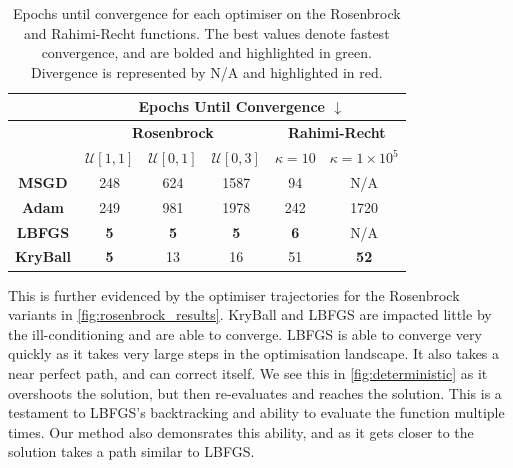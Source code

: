\begin{table}[!t]
    \caption{Epochs until convergence for each optimiser on the Rosenbrock and Rahimi-Recht functions. The best values denote fastest convergence, and are bolded and highlighted in green. Divergence is represented by N/A and highlighted in red.}
    \label{tab:task_1_convergence_table}
    \begin{tabular}{cccccc}
    \hline
    \multicolumn{1}{l}{} & \multicolumn{5}{c}{\textbf{Epochs Until Convergence $\downarrow$}}                                                                                                                                   \\ \hline
                         & \multicolumn{3}{c}{\textbf{Rosenbrock}}                                                                      & \multicolumn{2}{c}{\textbf{Rahimi-Recht}}                                \\
                         & \textbf{$\mathcal{U}[1,1]$}                & \textbf{$\mathcal{U}[0,1]$}                & \textbf{$\mathcal{U}[0,3]$}                & \textbf{$\kappa = 10$}                      & \textbf{$\kappa = 1 \times 10^5$}                      \\ \hline
    \textbf{MSGD}        & 248                                & 624                                & 1587                               & \cellcolor[HTML]{FFFFFF}94         & \cellcolor[HTML]{FD6864}N/A         \\
    \textbf{Adam}        & 249                                & 981                                & 1978                               & 242                                & \cellcolor[HTML]{FFFFFF}1720        \\ \hline
    \textbf{LBFGS}       & \cellcolor[HTML]{34FF34}\textbf{5} & \cellcolor[HTML]{34FF34}\textbf{5} & \cellcolor[HTML]{34FF34}\textbf{5} & \cellcolor[HTML]{34FF34}\textbf{6} & \cellcolor[HTML]{FD6864}N/A         \\
    \textbf{KryBall}     & \cellcolor[HTML]{34FF34}\textbf{5} & 13                                 & 16                                 & 51                                 & \cellcolor[HTML]{34FF34}\textbf{52} \\ \hline
    \end{tabular}
\end{table}

This is further evidenced by the optimiser trajectories for the Rosenbrock variants in \cref{fig:rosenbrock_results}. KryBall and LBFGS are impacted little by the ill-conditioning and are able to converge. LBFGS is able to converge very quickly as it takes very large steps in the optimisation landscape. It also takes a near perfect path, and can correct itself. We see this in \cref{fig:deterministic} as it overshoots the solution, but then re-evaluates and reaches the solution. This is a testament to LBFGS's backtracking and ability to evaluate the function multiple times. Our method also demonsrates this ability, and as it gets closer to the solution takes a path similar to LBFGS.


